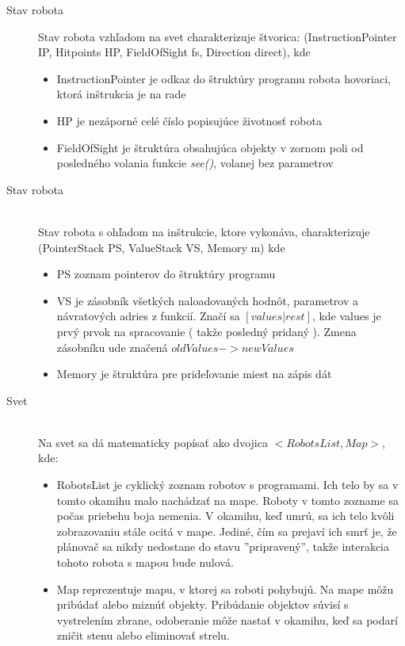 \begin{description}
\item [Stav robota]
	Stav robota vzhľadom na svet charakterizuje štvorica: (InstructionPointer IP, Hitpoints HP, FieldOfSight fs, Direction direct), kde 
\begin{itemize}
\item InstructionPointer je odkaz do štruktúry programu robota hovoriaci, ktorá inštrukcia je na rade
\item HP je nezáporné celé číslo popisujúce životnosť robota
\item FieldOfSight je štruktúra obsahujúca objekty v zornom poli od posledného volania funkcie \emph{see()}, volanej bez parametrov 
\end{itemize}
\item[Stav robota] \hfill \\
	Stav robota s ohľadom na inštrukcie, ktore vykonáva, charakterizuje (PointerStack PS, ValueStack VS, Memory m) kde
\begin{itemize}
\item PS zoznam pointerov do štruktúry programu
\item VS je zásobník všetkých naloadovaných hodnôt, parametrov  a návratových adries z funkcií. Značí sa $[values|rest]$, kde values je prvý prvok na spracovanie ( takže posledný pridaný ). Zmena zásobníku ude značená $ oldValues -> newValues $
\item Memory je štruktúra pre prideľovanie miest na zápis dát
\end{itemize}
\label{StavRobota}
\item[Svet] \hfill \\
Na svet sa dá matematicky popísať ako dvojica $< RobotsList, Map >$, kde:
\begin{itemize}
\item RobotsList je cyklický zoznam robotov s programami. Ich telo by sa v tomto okamihu malo nachádzať na mape. Roboty v tomto zozname sa počas priebehu boja nemenia. V okamihu, keď umrú, sa ich telo kvôli zobrazovaniu stále ocitá v mape. Jediné, čím sa prejaví ich smrť je, že plánovač sa nikdy nedostane do stavu ''pripravený'', takže interakcia tohoto robota s mapou bude nulová.
\item Map reprezentuje mapu, v ktorej sa roboti pohybujú. Na mape môžu pribúdať alebo miznúť objekty. Pribúdanie objektov súvisí s vystrelením zbrane, odoberanie môže nastať v okamihu, keď sa podarí zničit stenu alebo eliminovať strelu.
\end{itemize}
\end{description}
